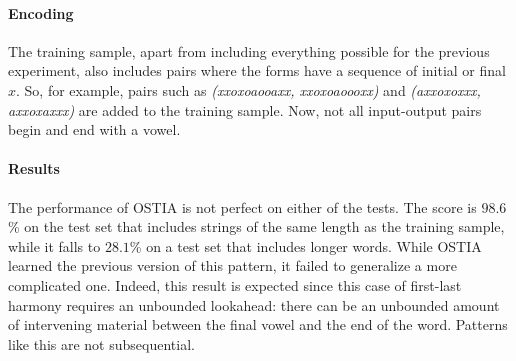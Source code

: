 \paragraph{Encoding}

The training sample, apart from including everything possible for the previous experiment, also includes pairs where the forms have a sequence of initial or final $x$.
So, for example, pairs such as \emph{(xxoxoaooaxx, xxoxoaoooxx)} and \emph{(axxoxoxxx, axxoxaxxx)} are added to the training sample.
Now, not all input-output pairs begin and end with a vowel.


\paragraph{Results}

The performance of OSTIA is not perfect on either of the tests.
The score is $98.6$\% on the test set that includes strings of the same length as the training sample, while it falls to $28.1$\% on a test set that includes longer words.
While OSTIA learned the previous version of this pattern, it failed to generalize a more complicated one.
Indeed, this result is expected since this case of first-last harmony requires an unbounded lookahead: there can be an unbounded amount of intervening material between the final vowel and the end of the word.
Patterns like this are not subsequential.


\begin{table}[h!]
\centering
{}
\caption{Results of OSTIA learning a ``complex'' first-last harmony.}
\end{table}





